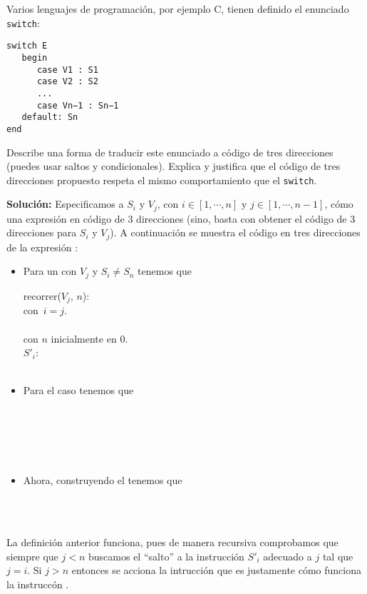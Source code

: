 Varios lenguajes de programaci\'on, por ejemplo \textsc{C}, tienen 
definido el enunciado \texttt{switch}:
\begin{verbatim}
switch E
   begin
      case V1 : S1
      case V2 : S2
      ...
      case Vn−1 : Sn−1
   default: Sn
end
\end{verbatim}
Describe una forma de traducir este enunciado a c\'odigo de tres direcciones 
(puedes usar saltos y condicionales).
Explica y justifica que el c\'odigo de tres direcciones propuesto respeta el 
mismo comportamiento que el \texttt{switch}.\newline

\textbf{Solución:} Especificamos a $S_i$ y $V_j$, con $i \in [1, \dotsm, n]$
y $j \in [1, \dotsm, n - 1]$, cómo una expresión en código de 3 direcciones
(sino, basta con obtener el código de 3 direcciones para $S_i$ y $V_j$). A
continuación se muestra el código en tres direcciones de la expresión :

\begin{itemize}
\item Para un  con $V_j$ y $S_i \not= S_{n}$ tenemos que

recorrer($V_j$, $n$):\\
\hspace*{0.2cm}  \hspace{6.8cm} con\ $i = j$.\\
\hspace*{0.2cm} \\

con $n$ inicialmente en $0$.\\

$S'_i$:\\
\hspace*{0.2cm} \\
\hspace*{0.2cm} 
\item Para el caso  tenemos que\newline

\\
\hspace*{0.2cm} \\

\\
\hspace*{0.2cm} \\
\hspace*{0.2cm} 
\item Ahora, construyendo el  tenemos que\newline

\\
\hspace*{0.2cm} \\
\hspace*{0.2cm} \newline
\end{itemize}

La definición anterior funciona, pues de manera recursiva comprobamos
que siempre que $j < n$ buscamos el ``salto'' a la instrucción $S'_i$
adecuado a $j$ tal que $j = i$. Si $j > n$ entonces se acciona la
intrucción  que es justamente cómo funciona la instruccón
.
